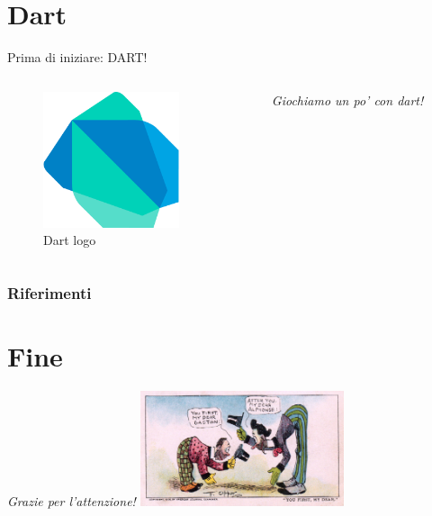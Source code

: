 \documentclass{../libs/presentation_format}
\begin{document}

\section{Dart}
\begin{frame}{Prima di iniziare: DART!}
	\begin{minipage}[0.2\textheight]{\textwidth}
		\begin{columns}[T]
			\begin{column}{0.4\textwidth}
				\begin{figure}[htpb]
					\centering
					\includegraphics[width=4cm]{../libs/dart-logo.png}
					\caption{Dart logo}
					\label{fig:Dart logo}
				\end{figure}
			\end{column}
			\begin{column}{0.6\textwidth}
				\emph{Giochiamo un po' con dart!}
				\newline
				\href{https://dartpad.dev/?}{}
			\end{column}
		\end{columns}
	\end{minipage}
\end{frame}


\begin{frame}[allowframebreaks]
    \frametitle{Riferimenti}
    \printbibliography
\end{frame}

\section{Fine}
\begin{frame}{}
	\huge\emph{Grazie per l'attenzione!}
	\newline
	\vfill
	\hfill\includegraphics[width=6cm]{../libs/alphonse-gaston-regards}
\end{frame}
\end{document}
